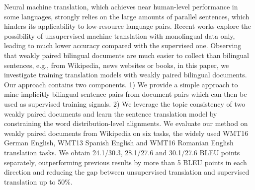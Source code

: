 Neural machine translation, which achieves near human-level performance in some languages, strongly relies on the large amounts of parallel sentences, which hinders its applicability to low-resource language pairs. Recent works explore the possibility of unsupervised machine translation with monolingual data only, leading to much lower accuracy compared with the supervised one. Observing that weakly paired bilingual documents are much easier to collect than bilingual sentences, e.g., from Wikipedia, news websites or books, in this paper, we investigate training translation models with weakly paired bilingual documents. Our approach contains two components. 1) We provide a simple approach to mine implicitly bilingual sentence pairs from document pairs which can then be used as supervised training signals. 2) We leverage the topic consistency of two weakly paired documents and learn the sentence translation model by constraining the word distribution-level alignments.  We evaluate our method on weakly paired documents from Wikipedia on six tasks, the widely used WMT16 German {\leftrightarrow} English, WMT13 Spanish {\leftrightarrow} English and WMT16 Romanian {\leftrightarrow} English translation tasks. We obtain 24.1/30.3, 28.1/27.6 and 30.1/27.6 BLEU points separately, outperforming previous results by more than 5 BLEU points in each direction and reducing the gap between unsupervised translation and supervised translation up to 50\%.